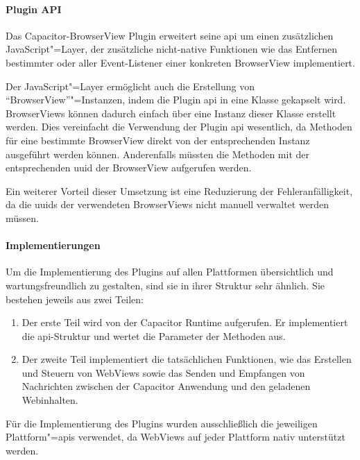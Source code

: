 \newpage

\paragraph{Plugin API}

Das Capacitor-BrowserView Plugin erweitert seine \ac{api} um einen zusätzlichen JavaScript"=Layer, der zusätzliche nicht-native Funktionen wie das Entfernen bestimmter oder aller Event-Listener einer konkreten BrowserView implementiert.

Der JavaScript"=Layer ermöglicht auch die Erstellung von \enquote{BrowserView}"=Instanzen, indem die Plugin \ac{api} in eine Klasse gekapselt wird.
BrowserViews können dadurch einfach über eine Instanz dieser Klasse erstellt werden.
Dies vereinfacht die Verwendung der Plugin \ac{api} wesentlich, da Methoden für eine bestimmte BrowserView direkt von der entsprechenden Instanz ausgeführt werden können.
Anderenfalls müssten die Methoden mit der entsprechenden \acs{uuid} der BrowserView aufgerufen werden.

Ein weiterer Vorteil dieser Umsetzung ist eine Reduzierung der Fehleranfälligkeit, da die \acsp{uuid} der verwendeten BrowserViews nicht manuell verwaltet werden müssen.

\newpage

\paragraph{Implementierungen}

Um die Implementierung des Plugins auf allen Plattformen übersichtlich und wartungsfreundlich zu gestalten, sind sie in ihrer Struktur sehr ähnlich.
Sie bestehen jeweils aus zwei Teilen:

\begin{enumerate}
    \item Der erste Teil wird von der Capacitor Runtime aufgerufen. Er implementiert die \acs{api}-Struktur und wertet die Parameter der Methoden aus.
    \item Der zweite Teil implementiert die tatsächlichen Funktionen, wie das Erstellen und Steuern von WebViews sowie das Senden und Empfangen von Nachrichten zwischen der Capacitor Anwendung und den geladenen Webinhalten.
\end{enumerate}

Für die Implementierung des Plugins wurden ausschließlich die jeweiligen Plattform"=\acsp{api} verwendet, da WebViews auf jeder Plattform nativ unterstützt werden.
\cite{android:api, ios:api, electron}

